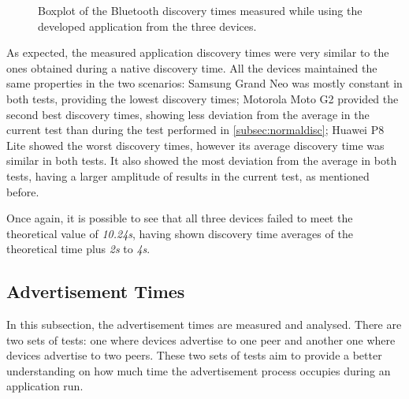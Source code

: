 \begin{figure}[ht]
	\noindent{}
	\caption{\label{fig:appdisc} Boxplot of the Bluetooth discovery times measured while using the developed application from the three devices.}
\end{figure}

As expected, the measured application discovery times were very similar to the ones obtained during a native discovery time. All the devices maintained the same properties in the two scenarios: Samsung Grand Neo was mostly constant in both tests, providing the lowest discovery times; Motorola Moto G2 provided the second best discovery times, showing less deviation from the average in the current test than during the test performed in \ref{subsec:normaldisc}; Huawei P8 Lite showed the worst discovery times, however its average discovery time was similar in both tests. It also showed the most deviation from the average in both tests, having a larger amplitude of results in the current test, as mentioned before.

Once again, it is possible to see that all three devices failed to meet the theoretical value of \textit{10.24s}, having shown discovery time averages of the theoretical time plus \textit{2s} to \textit{4s}.

\subsection{Advertisement Times}

In this subsection, the advertisement times are measured and analysed. There are two sets of tests: one where devices advertise to one peer and another one where devices advertise to two peers. These two sets of tests aim to provide a better understanding on how much time the advertisement process occupies during an application run.

